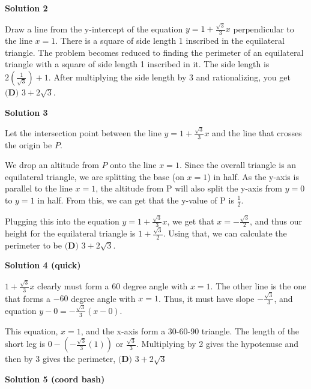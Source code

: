 \begin{enumerate}
\textbf{Solution 2}

Draw a line from the y-intercept of the equation  $y=1+ \frac{\sqrt{3}}{3} x$ perpendicular to the line $x=1$. There is a square of side length 1 inscribed in the equilateral triangle. The problem becomes reduced to finding the perimeter of an equilateral triangle with a square of side length 1 inscribed in it. The side length is $2\left(\frac{1}{\sqrt{3}}\right) + 1$. After multiplying the side length by 3 and rationalizing, you get $\boxed{\textbf{(D) }3 + 2\sqrt{3}}$.

 



\textbf{Solution 3}

Let the intersection point between the line $y = 1 + \frac{\sqrt{3}}{3}x$ and the line that crosses the origin be $P$.

 We drop an altitude from $P$ onto the line $x = 1$. Since the overall triangle is an equilateral triangle, we are splitting the base (on $x=1$) in half. As the y-axis is parallel to the line $x=1$, the altitude from P will also split the y-axis from $y=0$ to $y=1$ in half. From this, we can get that the y-value of P is $\frac{1}{2}$.

 Plugging this into the equation $y = 1 + \frac{\sqrt{3}}{3}x$, we get that $x = -\frac{\sqrt{3}}{2}$, and thus our height for the equilateral triangle is $1 + \frac{\sqrt{3}}{2}$. Using that, we can calculate the perimeter to be $\boxed{\textbf{(D) }3 + 2\sqrt{3}}$.

 



\textbf{Solution 4 (quick)}

$1+\frac{\sqrt{3}}{3}x$ clearly must form a 60 degree angle with $x=1$. The other line is the one that forms a $-60$ degree angle with $x=1$. Thus, it must have slope $-\frac{\sqrt{3}}{3}$, and equation $y-0=-\frac{\sqrt{3}}{3}(x-0)$.

 This equation, $x=1$, and the x-axis form a 30-60-90 triangle. The length of the short leg is $0-(-\frac{\sqrt{3}}{3}(1))$ or $\frac{\sqrt{3}}{3}$. Multiplying by 2 gives the hypotenuse and then by 3 gives the perimeter, $\boxed{\textbf{(D) }3 + 2\sqrt{3}}$




\textbf{Solution 5 (coord bash)}


\end{enumerate}
